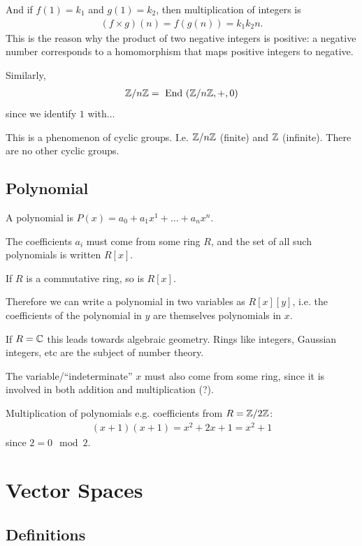 And if $f(1) = k_1$ and $g(1) = k_2$, then multiplication of integers is
\begin{align*}
  (f \times g)(n) = f(g(n)) = k_1k_2n.
\end{align*}
This is the reason why the product of two negative integers is positive: a
negative number corresponds to a homomorphism that maps positive integers to
negative.

Similarly,
\begin{align*}
  \mathbb{Z}/n\mathbb{Z} = ~\text{End}~(\mathbb{Z}/n\mathbb{Z}, +, 0)
\end{align*}
since we identify $1$ with...

This is a phenomenon of cyclic groups. I.e. $\mathbb{Z}/n\mathbb{Z}$ (finite) and $\mathbb{Z}$
(infinite). There are no other cyclic groups.

\subsection{Polynomial}

A polynomial is $P(x) = a_0 + a_1x^1 + \ldots + a_nx^n$.

The coefficients $a_i$ must come from some ring $R$, and the set of all such
polynomials is written $R[x]$.

If $R$ is a commutative ring, so is $R[x]$.

Therefore we can write a polynomial in two variables as $R[x][y]$, i.e. the
coefficients of the polynomial in $y$ are themselves polynomials in $x$.

If $R = \mathbb{C}$ this leads towards algebraic geometry. Rings like integers,
Gaussian integers, etc are the subject of number theory.

The variable/``indeterminate'' $x$ must also come from some ring, since it is
involved in both addition and multiplication (?).

Multiplication of polynomials e.g. coefficients from $R = \mathbb{Z}/2\mathbb{Z}$:
\begin{align*}
(x + 1)(x + 1) = x^2 + 2x + 1 = x^2 + 1
\end{align*}
since $2 = 0 \mod 2$.

\section{Vector Spaces}

\subsection{Definitions}


